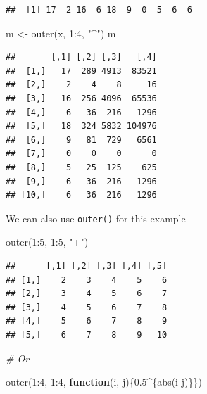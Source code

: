 \documentclass[
]{book}
\newenvironment{Shaded}{\begin{snugshade}}{\end{snugshade}}
\newcommand{\CommentTok}[1]{\textcolor[rgb]{0.56,0.35,0.01}{\textit{#1}}}
\newcommand{\ControlFlowTok}[1]{\textcolor[rgb]{0.13,0.29,0.53}{\textbf{#1}}}
\newcommand{\DecValTok}[1]{\textcolor[rgb]{0.00,0.00,0.81}{#1}}
\newcommand{\FloatTok}[1]{\textcolor[rgb]{0.00,0.00,0.81}{#1}}
\newcommand{\FunctionTok}[1]{\textcolor[rgb]{0.00,0.00,0.00}{#1}}
\newcommand{\NormalTok}[1]{#1}
\newcommand{\OtherTok}[1]{\textcolor[rgb]{0.56,0.35,0.01}{#1}}
\newcommand{\SpecialCharTok}[1]{\textcolor[rgb]{0.00,0.00,0.00}{#1}}
\newcommand{\StringTok}[1]{\textcolor[rgb]{0.31,0.60,0.02}{#1}}
\begin{document}
\begin{verbatim}
##  [1] 17  2 16  6 18  9  0  5  6  6
\end{verbatim}

\begin{Shaded}
\begin{Highlighting}[]
\NormalTok{m }\OtherTok{\textless{}{-}} \FunctionTok{outer}\NormalTok{(x, }\DecValTok{1}\SpecialCharTok{:}\DecValTok{4}\NormalTok{, }\StringTok{"\^{}"}\NormalTok{)}
\NormalTok{m}
\end{Highlighting}
\end{Shaded}

\begin{verbatim}
##       [,1] [,2] [,3]   [,4]
##  [1,]   17  289 4913  83521
##  [2,]    2    4    8     16
##  [3,]   16  256 4096  65536
##  [4,]    6   36  216   1296
##  [5,]   18  324 5832 104976
##  [6,]    9   81  729   6561
##  [7,]    0    0    0      0
##  [8,]    5   25  125    625
##  [9,]    6   36  216   1296
## [10,]    6   36  216   1296
\end{verbatim}

We can also use \texttt{outer()} for this example

\begin{Shaded}
\begin{Highlighting}[]
\FunctionTok{outer}\NormalTok{(}\DecValTok{1}\SpecialCharTok{:}\DecValTok{5}\NormalTok{, }\DecValTok{1}\SpecialCharTok{:}\DecValTok{5}\NormalTok{, }\StringTok{"+"}\NormalTok{)}
\end{Highlighting}
\end{Shaded}

\begin{verbatim}
##      [,1] [,2] [,3] [,4] [,5]
## [1,]    2    3    4    5    6
## [2,]    3    4    5    6    7
## [3,]    4    5    6    7    8
## [4,]    5    6    7    8    9
## [5,]    6    7    8    9   10
\end{verbatim}

\begin{Shaded}
\begin{Highlighting}[]
\CommentTok{\# Or}

\FunctionTok{outer}\NormalTok{(}\DecValTok{1}\SpecialCharTok{:}\DecValTok{4}\NormalTok{, }\DecValTok{1}\SpecialCharTok{:}\DecValTok{4}\NormalTok{, }\ControlFlowTok{function}\NormalTok{(i, j)\{}\FloatTok{0.5}\SpecialCharTok{\^{}}\NormalTok{\{}\FunctionTok{abs}\NormalTok{(i}\SpecialCharTok{{-}}\NormalTok{j)\}\})}
\end{Highlighting}
\end{Shaded}
\end{document}
